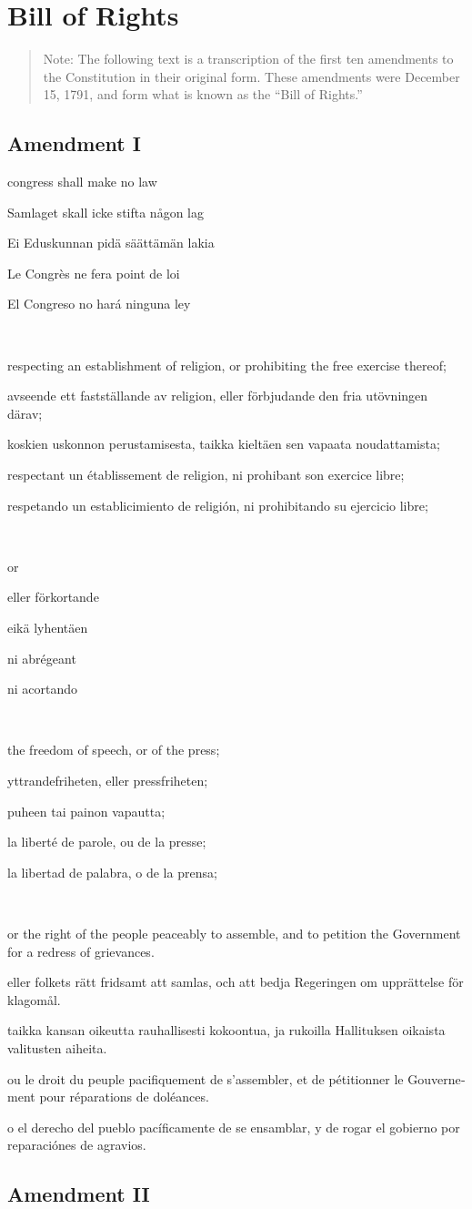 \documentclass[a4paper,landscape,10pt]{article}
\newcommand{\tblock}[5]{\noindent\begin{minipage}[t]{0.18\textwidth}\foreignlanguage{english}{#1}\end{minipage}\hskip 0.025\textwidth\begin{minipage}[t]{0.18\textwidth}\foreignlanguage{swedish}{#2}\end{minipage}\hskip 0.025\textwidth\begin{minipage}[t]{0.18\textwidth}\foreignlanguage{finnish}{#3}\end{minipage}\hskip 0.025\textwidth\begin{minipage}[t]{0.18\textwidth}\foreignlanguage{french}{#4}\end{minipage}\hskip 0.025\textwidth\begin{minipage}[t]{0.18\textwidth}\foreignlanguage{spanish}{#5}\end{minipage}}
\begin{document}
\section*{Bill of Rights}
\begin{quote}\small{}
Note: The following text is a transcription of the first ten amendments to the Constitution in their original form. These amendments were  December 15, 1791, and form what is known as the ``Bill of Rights.''
\end{quote}
\subsection*{Amendment I}
\tblock
{\Gls{congress} shall make no law}
{Samlaget skall icke stifta någon lag}
{Ei Eduskunnan pidä säättämän lakia}
{Le Congrès ne fera point de loi}
{El Congreso no hará ninguna ley}

~

\tblock
{respecting an establishment of religion, or prohibiting the free exercise thereof;}
{avseende ett fastställande av religion, eller förbjudande den fria utövningen därav;}
{koskien uskonnon perustamisesta, taikka kieltäen sen vapaata noudattamista;}
{respectant un établissement de religion, ni prohibant son exercice libre;}
{respetando un establicimiento de religión, ni prohibitando su ejercicio libre;}

~

\tblock
{or }
{eller förkortande}
{eikä lyhentäen}
{ni abrégeant}
{ni acortando}

~

\tblock
{the freedom of speech, or of the press;}
{yttrandefriheten, eller pressfriheten;}
{puheen tai painon vapautta;}
{la liberté de parole, ou de la presse;}
{la libertad de palabra, o de la prensa;}

~

\tblock
{or the right of the people peaceably to assemble, and to petition the Government for a \gls{redress} of \glspl{grievance}.}
{eller folkets rätt fridsamt att samlas, och att bedja Regeringen om upprättelse för klagomål.}
{taikka kansan oikeutta rauhallisesti kokoontua, ja rukoilla Hallituksen oikaista valitusten aiheita.}
{ou le droit du peuple pacifiquement de s'assembler, et de pétitionner le Gouvernement pour réparations de doléances.}
{o el derecho del pueblo pacíficamente de se ensamblar, y de rogar el gobierno por reparaciónes de agravios.}


\subsection*{Amendment II}
\end{document}
